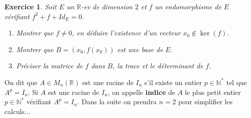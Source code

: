 \documentclass[12pt,a4paper]{article}
\newcommand{\R}{\mathbb{R}}
\newcommand{\N}{\mathbb{N}}
\theoremstyle{break}
\theoremstyle{break}
\newtheorem{Exo}{Exercice}
\begin{document}
\begin{Exo}
	Soit $E$ un $\R$-ev de dimension $2$ et $f$ un endomorphisme de $E$ vérifiant $f^2+f+Id_E=0$.
\begin{enumerate}
	\item Montrer que $f\neq 0$, en déduire l'existence d'un vecteur $x_0\notin\ker(f)$.
	\item Montrer que $B=(x_0,f(x_0))$ est une base de $E$.
	\item
	Préciser la matrice de $f$ dans $B$, la trace et le déterminant de $f$.
\end{enumerate}
\end{Exo}


\begin{center}
\end{center}

On dit que $A\in M_{n}(\R) $ est une racine de $I_{n}$
s'il existe un entier $p\in \N^*$ tel que $A^{p}=I_{n}.$ Si $A$
est une racine de $I_{n}$, on appelle \textbf{indice} de $A$ le plus petit
entier $p\in \N^*$ v\'{e}rifiant $A^{p}=I_{n}.$ Dans la suite
on prendra $n=2$ pour simplifier les calculs...
\end{document}
